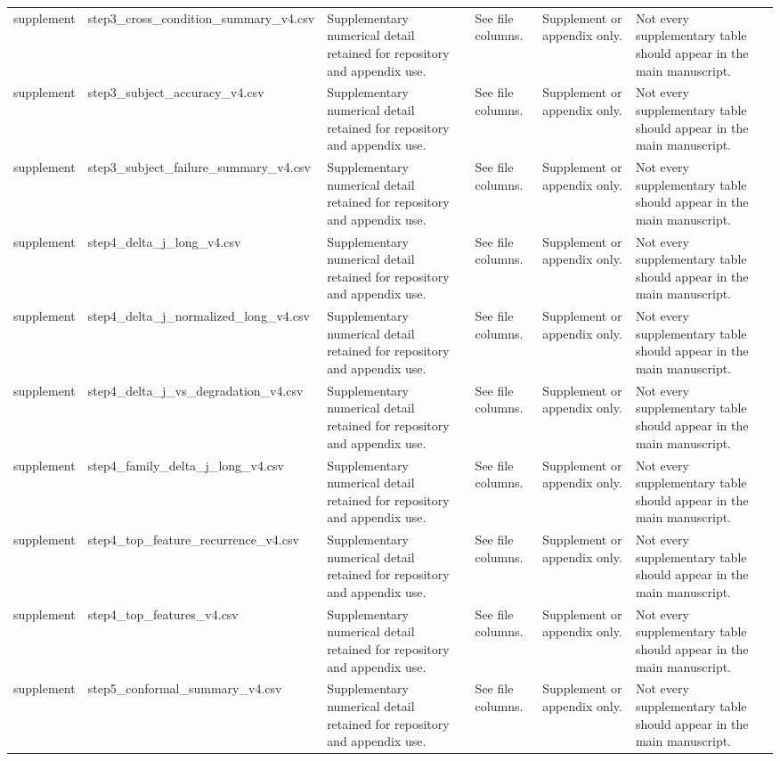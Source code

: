 \begin{longtable}{llllll}
supplement & step3_cross_condition_summary_v4.csv & Supplementary numerical detail retained for repository and appendix use. & See file columns. & Supplement or appendix only. & Not every supplementary table should appear in the main manuscript. \\
supplement & step3_subject_accuracy_v4.csv & Supplementary numerical detail retained for repository and appendix use. & See file columns. & Supplement or appendix only. & Not every supplementary table should appear in the main manuscript. \\
supplement & step3_subject_failure_summary_v4.csv & Supplementary numerical detail retained for repository and appendix use. & See file columns. & Supplement or appendix only. & Not every supplementary table should appear in the main manuscript. \\
supplement & step4_delta_j_long_v4.csv & Supplementary numerical detail retained for repository and appendix use. & See file columns. & Supplement or appendix only. & Not every supplementary table should appear in the main manuscript. \\
supplement & step4_delta_j_normalized_long_v4.csv & Supplementary numerical detail retained for repository and appendix use. & See file columns. & Supplement or appendix only. & Not every supplementary table should appear in the main manuscript. \\
supplement & step4_delta_j_vs_degradation_v4.csv & Supplementary numerical detail retained for repository and appendix use. & See file columns. & Supplement or appendix only. & Not every supplementary table should appear in the main manuscript. \\
supplement & step4_family_delta_j_long_v4.csv & Supplementary numerical detail retained for repository and appendix use. & See file columns. & Supplement or appendix only. & Not every supplementary table should appear in the main manuscript. \\
supplement & step4_top_feature_recurrence_v4.csv & Supplementary numerical detail retained for repository and appendix use. & See file columns. & Supplement or appendix only. & Not every supplementary table should appear in the main manuscript. \\
supplement & step4_top_features_v4.csv & Supplementary numerical detail retained for repository and appendix use. & See file columns. & Supplement or appendix only. & Not every supplementary table should appear in the main manuscript. \\
supplement & step5_conformal_summary_v4.csv & Supplementary numerical detail retained for repository and appendix use. & See file columns. & Supplement or appendix only. & Not every supplementary table should appear in the main manuscript. \\

\end{longtable}
